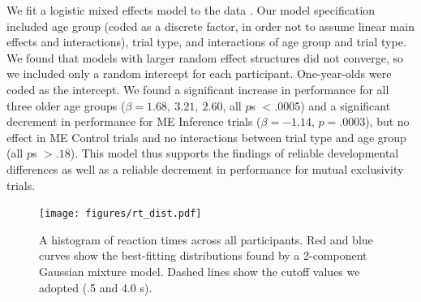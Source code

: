 \documentclass[man,noapacite]{apa2}
\begin{document}

We fit a logistic mixed effects model to the data \cite{jaeger2008}. Our model specification included age group (coded as a discrete factor, in order not to assume linear main effects and interactions), trial type, and interactions of age group and trial type. We found that models with larger random effect structures did not converge, so we included only a random intercept for each participant. One-year-olds were coded as the intercept. We found a significant increase in performance for all three older age groups ($\beta = 1.68,~3.21,~2.60$, all $p$s $< .0005$) and a significant decrement in performance for ME Inference trials  ($\beta = -1.14$, $p = .0003$), but no effect in ME Control trials and no interactions between trial type and age group (all $p$s $> .18$). This model thus supports the findings of reliable developmental differences as well as a reliable decrement in performance for mutual exclusivity trials.

\begin{figure}[t] 
  \begin{center} 
    \texttt{[image: figures/rt\_dist.pdf]} 
    \caption{\label{fig:rtdist} A histogram of reaction times across all participants. Red and blue curves show the best-fitting distributions found by a 2-component Gaussian mixture model. Dashed lines show the cutoff values we adopted (.5 and 4.0 s).}
  \end{center} 
\end{figure}
\end{document}
